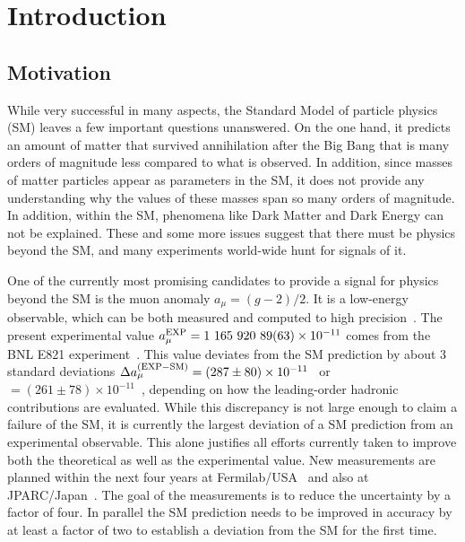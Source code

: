 \section{Introduction}
\subsection{Motivation}
While very successful in many aspects, the Standard Model of particle physics (SM)
leaves a few important questions unanswered. On the one hand, it predicts
an amount of matter that survived annihilation after the Big Bang that is many orders
of magnitude less compared to what is observed. In addition, since masses
of matter particles appear as parameters in the SM, it does not provide any understanding
why the values of these masses span so many orders of magnitude.
In addition, within the SM, phenomena like Dark Matter and Dark Energy can not be explained.
These and some more 
issues suggest that there must be physics beyond the SM, and many experiments
world-wide hunt for signals of it. 

One of the currently most promising candidates to provide a signal for physics beyond the SM
is the muon anomaly $a_\mu = (g-2)/2$. It is a low-energy observable, which
can be both measured and computed to high precision~\cite{Jegerlehner:2009ry,Blum:2013xva}.  The present experimental
value $a_\mu^{\rm EXP}= 1\ 165\ 920\ 89 (63)\times 10^{-11}$
comes from the BNL E821 experiment~\cite{Bennett:2006fi}.  This value
deviates from the SM prediction by about 3 standard
deviations $\Delta a_\mu^{({\rm EXP-SM})}= (287\pm 80)\times 10^{-11}$~\cite{Davier:2010nc} 
or $= (261\pm 78)\times 10^{-11}$~\cite{Hagiwara:2011af}, depending on how the leading-order
hadronic contributions are evaluated.  While this discrepancy
is not large enough to claim a failure of the SM, it is currently the largest
deviation of a SM prediction from an experimental observable. This
alone justifies all efforts currently taken to improve both the theoretical as well as the experimental value.
New measurements are planned within the next four years at 
Fermilab/USA~\cite{Grange:2015fou} and also at JPARC/Japan~\cite{Saito:2012zz}. The goal
of the measurements is to reduce the uncertainty by a factor of four. 
In parallel the SM prediction needs to be improved in accuracy 
by at least a factor of two to establish a deviation from the SM for the first time.


